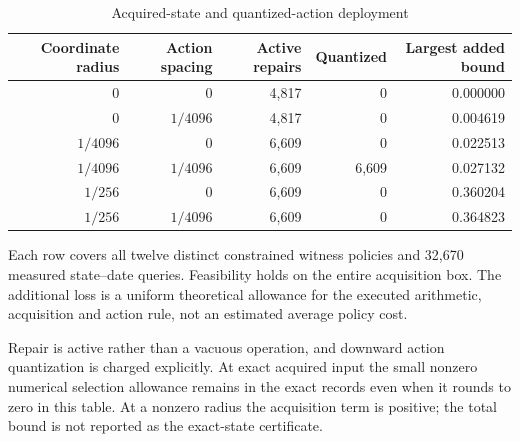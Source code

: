 \begin{table}[htbp]\centering
\caption{Acquired-state and quantized-action deployment}\label{tab:acquisition47}
\begin{tabular}{rrrrr}\toprule
Coordinate radius & Action spacing & Active repairs & Quantized & Largest added bound\\\midrule
$0$ & $0$ & 4,817 & 0 & 0.000000 \\
$0$ & $1/4096$ & 4,817 & 0 & 0.004619 \\
$1/4096$ & $0$ & 6,609 & 0 & 0.022513 \\
$1/4096$ & $1/4096$ & 6,609 & 6,609 & 0.027132 \\
$1/256$ & $0$ & 6,609 & 0 & 0.360204 \\
$1/256$ & $1/4096$ & 6,609 & 0 & 0.364823 \\
\bottomrule\end{tabular}
\par\smallskip\begin{minipage}{0.98\linewidth}\footnotesize Each row covers all twelve distinct constrained witness policies and 32,670 measured state--date queries. Feasibility holds on the entire acquisition box. The additional loss is a uniform theoretical allowance for the executed arithmetic, acquisition and action rule, not an estimated average policy cost.\end{minipage}\end{table}

Repair is active rather than a vacuous operation, and downward action quantization is charged explicitly. At exact acquired input the small nonzero numerical selection allowance remains in the exact records even when it rounds to zero in this table. At a nonzero radius the acquisition term is positive; the total bound is not reported as the exact-state certificate.

